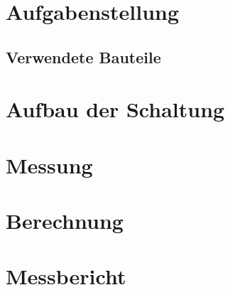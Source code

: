 \documentclass[11pt,a4paper,fleqn]{scrartcl}
\begin{document}
\Titelseite
\ifindex\else\tableofcontents\newpage\fi

\section{Aufgabenstellung}

\subsection{Verwendete Bauteile}

\section{Aufbau der Schaltung}

\section{Messung}

\section{Berechnung}

\section{Messbericht}
\end{document}
